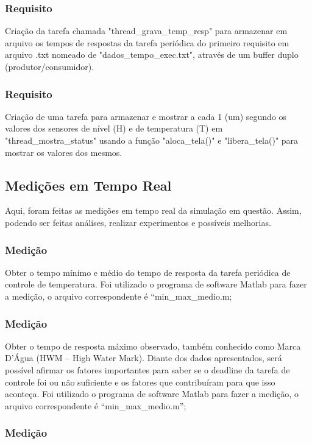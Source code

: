 \documentclass[journal]{IEEEtran}
\begin{document}
\subsubsection{Requisito}Criação da tarefa chamada "thread\_grava\_temp\_resp" para armazenar em arquivo os tempos de respostas da tarefa periódica do primeiro requisito em arquivo .txt nomeado de "dados\_tempo\_exec.txt", através de um buffer duplo (produtor/consumidor).

\subsubsection{Requisito}Criação de uma tarefa para armazenar e mostrar a cada 1 (um) segundo os valores dos sensores de nível (H) e de temperatura (T) em "thread\_mostra\_status" usando a função "aloca\_tela()" e "libera\_tela()" para mostrar os valores dos mesmos.

\subsection{Medições em Tempo Real}

Aqui, foram feitas as medições em tempo real da simulação em questão. Assim, podendo ser feitas análises, realizar experimentos e possíveis melhorias.

\subsubsection{Medição}

Obter o tempo mínimo e médio do tempo de resposta da tarefa periódica de controle de temperatura. Foi utilizado o programa de software Matlab para fazer a medição, o arquivo correspondente é “min\_max\_medio.m;

\subsubsection{Medição}

Obter o tempo de resposta máximo observado, também conhecido como Marca D’Água (HWM – High Water Mark). Diante dos dados apresentados, será possível afirmar os fatores importantes para saber se o deadline da tarefa de controle foi ou não suficiente e os fatores que contribuíram para que isso aconteça. Foi utilizado o programa de software Matlab para fazer a medição, o arquivo correspondente é “min\_max\_medio.m”;

\subsubsection{Medição}
\end{document}
